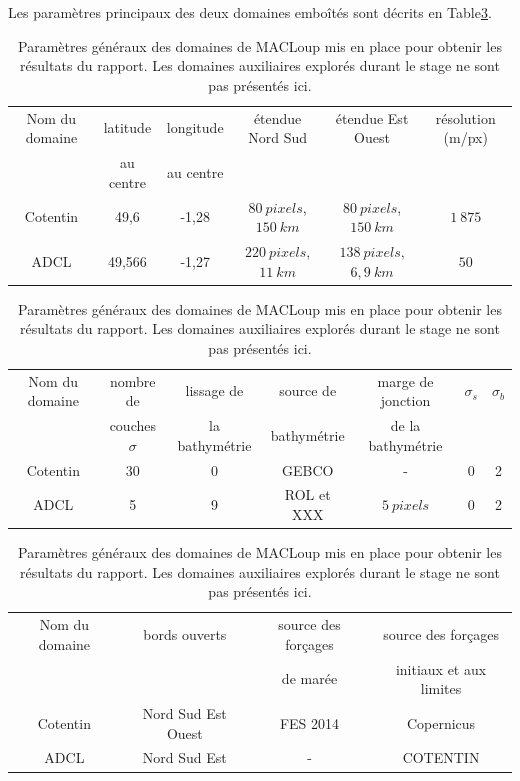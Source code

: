 \documentclass[10pt,a4paper,titlepage]{article}
\begin{document}
Les paramètres principaux des deux domaines emboîtés sont décrits en Table\ref{table:param_generaux}.

\begin{table}[h!]
    \centering

    \begin{tabular}{||c||c|c|c|c|c|}
        \hline
        Nom du domaine & latitude & longitude & étendue Nord Sud & étendue Est Ouest & résolution (m/px)\\
        & au centre & au centre &  &  & \\
        \hline
        Cotentin & 49,6 & -1,28 & $80~pixels$, $150~km$ & $80~pixels$, $150~km$ & $1~875$\\
        ADCL & 49,566 & -1,27 & $220~pixels$, $11~km$ & $138~pixels$, $6,9~km$ & $50$\\
        \hline
    \end{tabular}\newline

    \begin{tabular}{||c||c|c|c|c|c|c|}
        \hline
        Nom du domaine & nombre de & lissage de & source de & marge de jonction & $\sigma_{s}$ & $\sigma_{b}$ \\
        & couches $\sigma$ & la bathymétrie & bathymétrie & de la bathymétrie &  & \\
        \hline
        Cotentin & 30 & 0 & GEBCO & - & 0  & 2 \\
        ADCL & 5 & 9 & ROL et XXX & $5~pixels$ & 0 & 2 \\
        \hline
    \end{tabular}\newline

    \begin{tabular}{||c||c|c|c|}
        \hline
        Nom du domaine & bords ouverts & source des forçages & source des forçages \\
        &  & de marée & initiaux et aux limites \\
        \hline
        Cotentin & Nord Sud Est Ouest & FES 2014 & Copernicus \\
        ADCL & Nord Sud Est & - & COTENTIN \\
        \hline
    \end{tabular}
    \caption{
        Paramètres généraux des domaines de MACLoup mis en place pour obtenir les résultats du rapport.
        Les domaines auxiliaires explorés durant le stage ne sont pas présentés ici.
    }
    \label{table:param_generaux}
\end{table}
\end{document}

